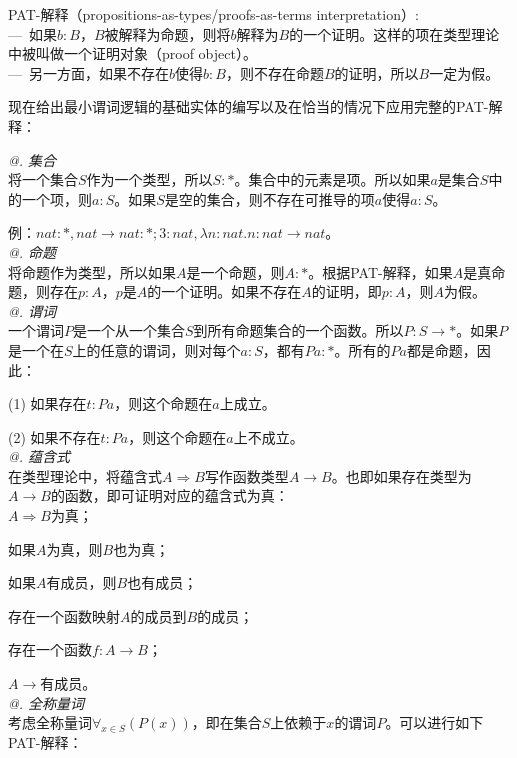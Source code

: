 \documentclass[UTF8]{article}
\makeatletter
\newcommand{\Rmnum}[1]{\expandafter\@slowromancap\romannumeral #1@}
\makeatother
\begin{document}
		PAT-解释（propositions-as-types/proofs-as-terms interpretation）:\\
		—\ 如果$b:B$，$B$被解释为命题，则将$b$解释为$B$的一个证明。这样的项在类型理论中被叫做一个证明对象（proof object）。\\
		—\ 另一方面，如果不存在$b$使得$b:B$，则不存在命题$B$的证明，所以$B$一定为假。
		
		现在给出最小谓词逻辑的基础实体的编写以及在恰当的情况下应用完整的PAT-解释：
		
		\noindent
		\textit{\Rmnum{1}. 集合}\\
		将一个集合$S$作为一个类型，所以$S:*$。集合中的元素是项。所以如果$a$是集合$S$中的一个项，则$a:S$。如果$S$是空的集合，则不存在可推导的项$a$使得$a:S$。
		
		例：$nat:*, nat\rightarrow nat:*; 3:nat, \lambda n:nat.n:nat\rightarrow nat$。\\
		
		\noindent
		\textit{\Rmnum{2}. 命题}\\
		将命题作为类型，所以如果$A$是一个命题，则$A:*$。根据PAT-解释，如果$A$是真命题，则存在$p:A$，$p$是$A$的一个证明。如果不存在$A$的证明，即$p:A$，则$A$为假。\\
		
		\noindent
		\textit{\Rmnum{3}. 谓词}\\
		一个谓词$P$是一个从一个集合$S$到所有命题集合的一个函数。所以$P:S\rightarrow*$。如果$P$是一个在$S$上的任意的谓词，则对每个$a:S$，都有$Pa:*$。所有的$Pa$都是命题，因此：
		
		(1) 如果存在$t:Pa$，则这个命题在$a$上成立。
		
		(2) 如果不存在$t:Pa$，则这个命题在$a$上不成立。\\
		
		\noindent
		\textit{\Rmnum{4}. 蕴含式}\\
		在类型理论中，将蕴含式$A\Rightarrow B$写作函数类型$A\rightarrow B$。也即如果存在类型为$A\rightarrow B$的函数，即可证明对应的蕴含式为真：\\
		
		$A\Rightarrow B$为真；
		
		如果$A$为真，则$B$也为真；
		
		如果$A$有成员，则$B$也有成员；
		
		存在一个函数映射$A$的成员到$B$的成员；
		
		存在一个函数$f:A\rightarrow B$；
		
		$A\rightarrow$有成员。\\
		
		\noindent
		\textit{\Rmnum{5}. 全称量词}\\
		考虑全称量词$\forall_{x\in S}(P(x))$，即在集合$S$上依赖于$x$的谓词$P$。可以进行如下PAT-解释：\\
		
\end{document}
